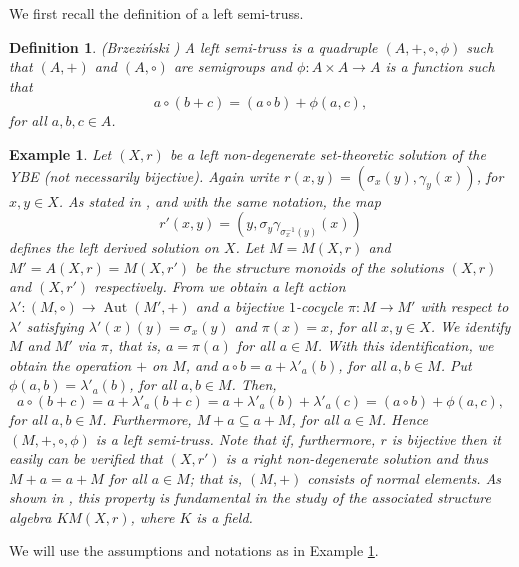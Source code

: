 \documentclass[10pt]{article}
\newtheorem{definition}[theorem]{Definition}
\newtheorem{example}[theorem]{Example}
\newcommand{\Aut}{\operatorname{Aut}}
\begin{document}
We first recall the definition of a left semi-truss.

\begin{definition} (Brzezi\'nski \cite{Br})
	A left semi-truss is a quadruple $(A,+,\circ,\phi)$ such that
	$(A,+)$ and $(A,\circ)$ are semigroups and $\phi\colon
	A\times A\longrightarrow A$ is a function such that
	$$a\circ (b+ c)= (a\circ b)+ \phi(a,c),$$
	for all $a,b,c\in A$.
\end{definition}

\begin{example}\cite[Example 5.2]{CJV}\label{ex1}
	{\rm Let $(X,r)$ be a left non-degenerate set-theoretic solution of
		the YBE (not necessarily bijective). Again write $r(x,y)=(\sigma_x(y),\gamma_y(x))$, for 
$x,y\in X$. 
		As stated in \cite[Section~3]{CJV},
		and with the same notation,  the map
		$$r'(x,y)=(y,\sigma_y\gamma_{\sigma^{-1}_x(y)}(x))$$ defines the left
		derived solution on $X$. Let $M=M(X,r)$ and $M'=A(X,r)=M(X,r')$ be
		the structure monoids of the solutions $(X,r)$ and $(X,r')$
		respectively. From \cite[Corollary~3.9 and
		Proposition~3.1]{CJV} we obtain a left action
		$\lambda'\colon (M,\circ )\longrightarrow \Aut(M',+)$ and a
		bijective $1$-cocycle $\pi\colon M\longrightarrow M'$ with respect
		to $\lambda'$ satisfying $\lambda'(x)(y)=\sigma_x(y)$ and
		$\pi(x)=x$, for all $x,y\in X$. We identify $M$ and $M'$ via $\pi$,
		that is, $a=\pi(a)$ for all $a\in M$. With this identification, we
		obtain  the operation $+$ on $M$, and $a\circ b=a+\lambda'_a(b)$,
		for all $a,b\in M$. Put $\phi(a,b)=\lambda'_a(b)$, for all $a,b\in
		M$. Then,
		$$a\circ (b+c)=a+\lambda'_a(b+c)=a+\lambda'_a(b)+\lambda'_a(c)=(a\circ b)+\phi(a,c),$$
		for all $a,b\in M$.
		Furthermore, $M + a \subseteq a+M$, for all $a\in M$. Hence
		$(M,+,\circ,\phi)$ is a left semi-truss. Note that if, furthermore,
		$r$ is bijective then it easily can be verified that $(X,r')$ is a
		right non-degenerate solution and thus  $M+a =a+M$ for all $a\in M$;
		that is, $(M,+)$ consists of normal elements. As shown in \cite{JKV},
		this property is fundamental in the study of the associated
		structure algebra $KM(X,r)$, where $K$ is a field.}
\end{example}

We will use the assumptions and notations as in Example \ref{ex1}.
\end{document}
